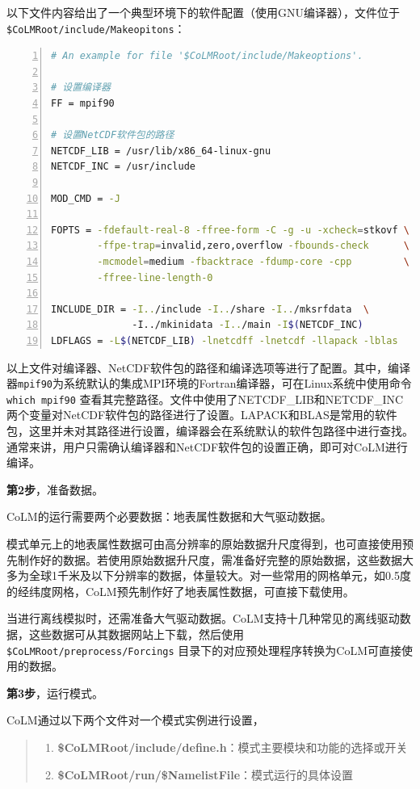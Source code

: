 \documentclass[a4paper,12pt,twoside]{article}
\begin{document}
以下文件内容给出了一个典型环境下的软件配置（使用GNU编译器），文件位于\texttt{\$CoLMRoot/include/\allowbreak Makeopitons}：
\begin{lstlisting}[language=bash, basicstyle=\linespread{1.2}\footnotesize\ttfamily, commentstyle=\color{olive}, numbers=left, numberstyle=\tiny, xleftmargin=1.5em,xrightmargin=0em, aboveskip=1em]
# An example for file '$CoLMRoot/include/Makeoptions'.

# 设置编译器
FF = mpif90

# 设置NetCDF软件包的路径
NETCDF_LIB = /usr/lib/x86_64-linux-gnu
NETCDF_INC = /usr/include

MOD_CMD = -J

FOPTS = -fdefault-real-8 -ffree-form -C -g -u -xcheck=stkovf \
        -ffpe-trap=invalid,zero,overflow -fbounds-check      \
        -mcmodel=medium -fbacktrace -fdump-core -cpp         \
        -ffree-line-length-0

INCLUDE_DIR = -I../include -I../share -I../mksrfdata  \ 
              -I../mkinidata -I../main -I$(NETCDF_INC)
LDFLAGS = -L$(NETCDF_LIB) -lnetcdff -lnetcdf -llapack -lblas

\end{lstlisting}

以上文件对编译器、NetCDF软件包的路径和编译选项等进行了配置。其中，编译器\texttt{mpif90}为系统默认的集成MPI环境的Fortran编译器，可在Linux系统中使用命令 \texttt{which mpif90} 查看其完整路径。文件中使用了NETCDF\_LIB和NETCDF\_INC两个变量对NetCDF软件包的路径进行了设置。LAPACK和BLAS是常用的软件包，这里并未对其路径进行设置，编译器会在系统默认的软件包路径中进行查找。通常来讲，用户只需确认编译器和NetCDF软件包的设置正确，即可对CoLM进行编译。

\bigskip
\textbf{第2步}，准备数据。

CoLM的运行需要两个必要数据：地表属性数据和大气驱动数据。

模式单元上的地表属性数据可由高分辨率的原始数据升尺度得到，也可直接使用预先制作好的数据。若使用原始数据升尺度，需准备好完整的原始数据，这些数据大多为全球1千米及以下分辨率的数据，体量较大。对一些常用的网格单元，如0.5度的经纬度网格，CoLM预先制作好了地表属性数据，可直接下载使用。

当进行离线模拟时，还需准备大气驱动数据。CoLM支持十几种常见的离线驱动数据，这些数据可从其数据网站上下载，然后使用 \texttt{\$CoLMRoot/preprocess/Forcings} 目录下的对应预处理程序转换为CoLM可直接使用的数据。

\bigskip
\textbf{第3步}，运行模式。

CoLM通过以下两个文件对一个模式实例进行设置，
\begin{quote}
\begin{enumerate}[label=\arabic*)]
    \item \textbf{\$CoLMRoot/include/define.h}：模式主要模块和功能的选择或开关
    \item \textbf{\$CoLMRoot/run/\$NamelistFile}：模式运行的具体设置
\end{enumerate}
\end{quote}
\end{document}
